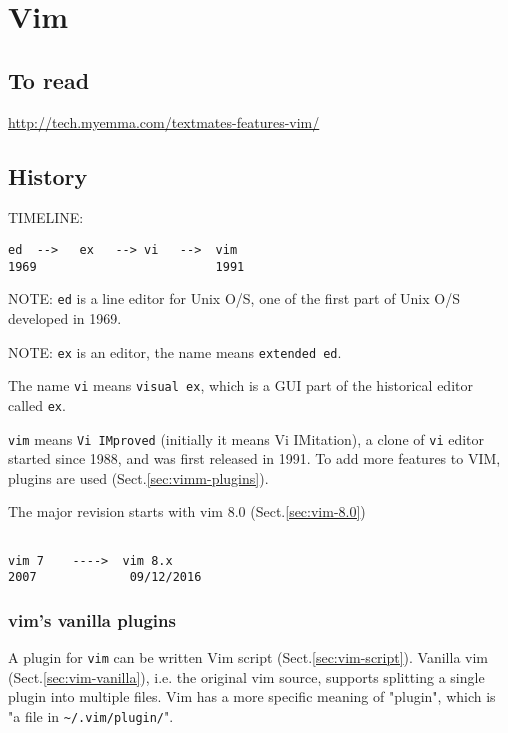 \chapter{Vim}
\label{chap:Vim}

\section{To read}

\url{http://tech.myemma.com/textmates-features-vim/}



\section{History}
\label{sec:vim-history}
\label{sec:ed-text-editor}
\label{sec:ex-text-editor}
\label{sec:vi-text-editor}

TIMELINE:
\begin{verbatim}
ed  -->   ex   --> vi   -->  vim
1969                         1991
\end{verbatim}

NOTE: \verb!ed! is a line editor for Unix O/S, one of the first part of Unix O/S
developed in 1969.

NOTE: \verb!ex! is an editor, the name means \verb!extended ed!.

The name \verb!vi! means \verb!visual ex!, which is a GUI part of the historical
editor called \verb!ex!. 

\verb!vim! means \verb!Vi IMproved! (initially it means Vi IMitation), a clone
of \verb!vi! editor started since 1988, and was first released in 1991.
To add more features to VIM, plugins are used (Sect.\ref{sec:vimm-plugins}).


The major revision starts with vim 8.0 (Sect.\ref{sec:vim-8.0})
\begin{verbatim}

vim 7    ---->  vim 8.x
2007             09/12/2016
\end{verbatim}



\subsection{vim's vanilla plugins}
\label{sec:vim-plugins}
\label{sec:vim-autoload}
\label{sec:vim-colors}
\label{sec:vim-indent}


A plugin for \verb!vim! can be written Vim script (Sect.\ref{sec:vim-script}).
Vanilla vim (Sect.\ref{sec:vim-vanilla}), i.e. the original vim source, supports
splitting a single plugin into multiple files.
Vim has a more specific meaning of "plugin", which is "a file in
\verb!~/.vim/plugin/!".

